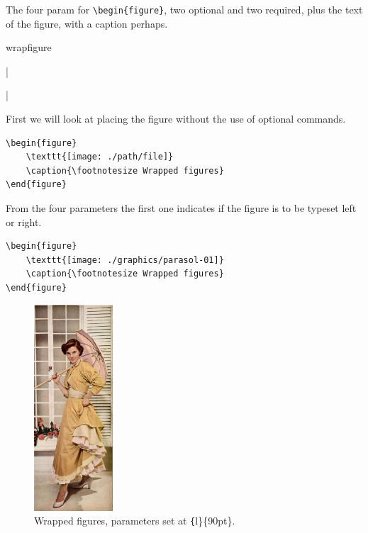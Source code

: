 The four param
for \verb+\begin{figure}+, two optional and two required, plus the text of the figure, with a caption perhaps.

\begin{macro}{wrapfigure}
\end{macro}

|\begin{figure}\end{figure}|



First we will look at placing the figure without the use of optional commands.


\begin{verbatim}
\begin{figure}
    \texttt{[image: ./path/file]}
    \caption{\footnotesize Wrapped figures}
\end{figure}
\end{verbatim}

From the four parameters the first one indicates if the figure is to be typeset left or right.

\begin{verbatim}
\begin{figure}
    \texttt{[image: ./graphics/parasol-01]}
    \caption{\footnotesize Wrapped figures}
\end{figure}
\end{verbatim}


\begin{figure}
    \captionsetup{name=Fig.}
    \relax
    \includegraphics[width=83pt]{./images/parasol-01.jpg}
    \caption{Wrapped figures, parameters set at \texttt\{l\}\{90pt\}.}
\end{figure}

